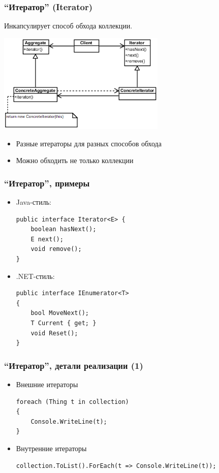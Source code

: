 \documentclass[xetex,mathserif,serif]{beamer}
\begin{document}
    \begin{frame}
        \frametitle{``Итератор'' (Iterator)}
        Инкапсулирует способ обхода коллекции.
        \begin{center}
            \includegraphics[width=0.6\textwidth]{iterator.png}
        \end{center}
        \begin{itemize}
            \item Разные итераторы для разных способов обхода
            \item Можно обходить не только коллекции
        \end{itemize}
    \end{frame}

    \begin{frame}[fragile]
        \frametitle{``Итератор'', примеры}
        \begin{itemize}
            \item Java-стиль:
            \begin{verbatim}
public interface Iterator<E> {
    boolean hasNext();
    E next();
    void remove();
}
            \end{verbatim}
            \item .NET-стиль:
            \begin{verbatim}
public interface IEnumerator<T>
{
    bool MoveNext();
    T Current { get; }
    void Reset();
}
            \end{verbatim}
        \end{itemize}
    \end{frame}

    \begin{frame}[fragile]
        \frametitle{``Итератор'', детали реализации (1)}
        \begin{itemize}
            \item Внешние итераторы
            \begin{verbatim}
foreach (Thing t in collection)
{
    Console.WriteLine(t);
} 
            \end{verbatim}
            \item Внутренние итераторы
            \begin{verbatim}
collection.ToList().ForEach(t => Console.WriteLine(t));
            \end{verbatim}
        \end{itemize}
    \end{frame}
\end{document}
